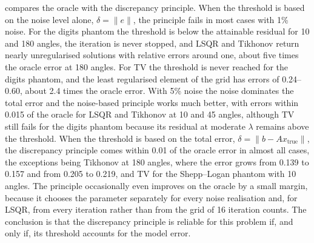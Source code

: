 \documentclass[11pt,a4paper]{article}
\numberwithin{equation}{section}
\theoremstyle{remark}
\newcommand{\xt}{x_{\mathrm{true}}}
\begin{document}
 compares the oracle with the discrepancy principle. When the threshold is based on the noise level alone, $\delta=\|e\|$, the principle fails in most cases with 1\% noise. For the digits phantom the threshold is below the attainable residual for 10 and 180 angles, the iteration is never stopped, and LSQR and Tikhonov return nearly unregularised solutions with relative errors around one, about five times the oracle error at 180 angles. For TV the threshold is never reached for the digits phantom, and the least regularised element of the grid has errors of 0.24--0.60, about 2.4 times the oracle error. With 5\% noise the noise dominates the total error and the noise-based principle works much better, with errors within 0.015 of the oracle for LSQR and Tikhonov at 10 and 45 angles, although TV still fails for the digits phantom because its residual at moderate $\lambda$ remains above the threshold. When the threshold is based on the total error, $\delta=\|b-A\xt\|$, the discrepancy principle comes within 0.01 of the oracle error in almost all cases, the exceptions being Tikhonov at 180 angles, where the error grows from 0.139 to 0.157 and from 0.205 to 0.219, and TV for the Shepp--Logan phantom with 10 angles. The principle occasionally even improves on the oracle by a small margin, because it chooses the parameter separately for every noise realisation and, for LSQR, from every iteration rather than from the grid of 16 iteration counts. The conclusion is that the discrepancy principle is reliable for this problem if, and only if, its threshold accounts for the model error.
\end{document}
